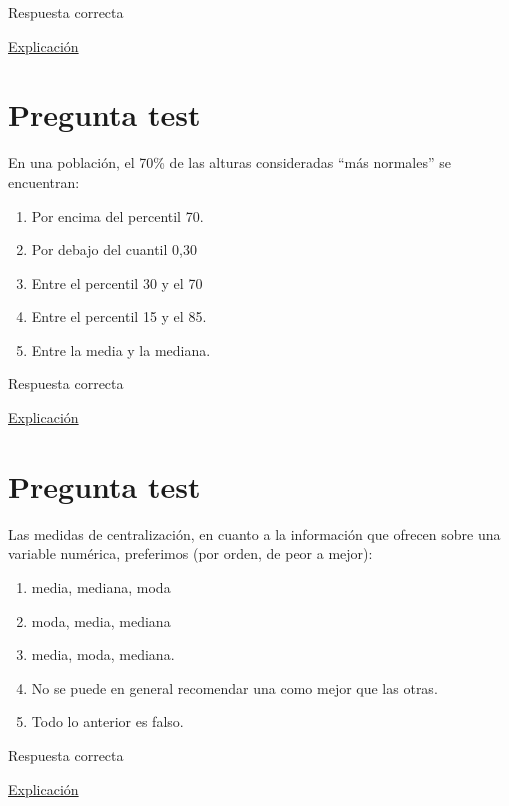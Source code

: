 \documentclass[
]{book}
\providecommand{\tightlist}{%
  \setlength{\itemsep}{0pt}\setlength{\parskip}{0pt}}
\begin{document}
Respuesta correcta

\href{https://1fjmanzano.github.io/bioestadistica/tipos-de-variables.html}{Explicación}

\hypertarget{pregunta-test-74}{%
\section{Pregunta test}\label{pregunta-test-74}}

En una población, el 70\% de las alturas consideradas ``más normales'' se encuentran:

\begin{enumerate}
\def\labelenumi{\alph{enumi})}
\tightlist
\item
  Por encima del percentil 70.
\item
  Por debajo del cuantil 0,30
\item
  Entre el percentil 30 y el 70
\item
  Entre el percentil 15 y el 85.
\item
  Entre la media y la mediana.
\end{enumerate}

Respuesta correcta

\href{https://1fjmanzano.github.io/bioestadistica/distribuciones-de-probabilidad.html\#distribucio\%CC\%81n-normal}{Explicación}

\hypertarget{pregunta-test-75}{%
\section{Pregunta test}\label{pregunta-test-75}}

Las medidas de centralización, en cuanto a la información que ofrecen sobre una variable numérica, preferimos (por orden, de peor a mejor):

\begin{enumerate}
\def\labelenumi{\alph{enumi})}
\tightlist
\item
  media, mediana, moda
\item
  moda, media, mediana
\item
  media, moda, mediana.
\item
  No se puede en general recomendar una como mejor que las otras.
\item
  Todo lo anterior es falso.
\end{enumerate}

Respuesta correcta

\href{https://1fjmanzano.github.io/bioestadistica/medidas-de-posicio\%CC\%81n-dispersio\%CC\%81n-y-forma.html\#medidas-de-posicio\%CC\%81n-centrales}{Explicación}
\end{document}

